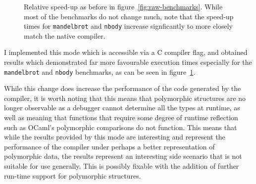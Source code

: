 \begin{figure}
    \centering

    \caption{Relative speed-up as before in figure~\ref{fig:raw-benchmarks}.
    While most of the benchmarks do not change much, note that the speed-up
    times for \texttt{mandelbrot} and \texttt{nbody} increase signficantly to
    more closely match the native compiler.}

    \label{fig:benchmarks-no-alloc}
\end{figure}

I implemented this mode which is accessible via a C compiler flag, and obtained
results which demonstrated far more favourable execution times especially for
the \texttt{mandelbrot} and \texttt{nbody} benchmarks, as can be seen in
figure~\ref{fig:benchmarks-no-alloc}.

While this change does increase the performance of the code generated by the
compiler, it is worth noting that this means that polymorphic structures are no
longer observable as a debugger cannot determine all the types at runtime, as
well as meaning that functions that require some degree of runtime reflection
such as OCaml's polymorphic comparisons do not function. This means that while
the results provided by this mode are interesting and represent the performance
of the compiler under perhaps a better representation of polymorphic data, the
results represent an interesting side scenario that is not suitable for use
generally. This is possibly fixable with the addition of further run-time
support for polymorphic structures.

